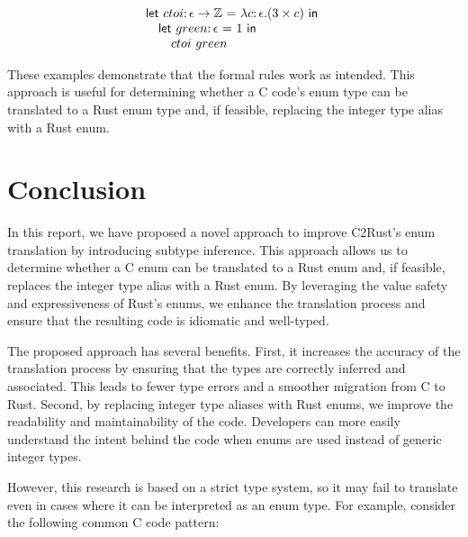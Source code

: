 \documentclass[10pt,conference]{IEEEtran}
\newcommand{\Z}{\ensuremath{\mathbb{Z}}}
\newcommand{\lett}[4]{\ensuremath{\mathsf{let}\ #1\mathsf{:}\,#2\ \mathsf{=}\ #3\ \mathsf{in}\ #4}}
\newcommand{\funct}[3]{\ensuremath{\lambda #1\mathsf{:}\,#2.#3}}
\newcommand{\apply}[2]{\ensuremath{#1\ #2}}
\begin{document}
\[
\begin{array}{l}
    \lett{ctoi}{\arrowt{\epsilon}{\Z}}{\funct{c}{\epsilon}{(3\times c)}}{}\\
    \quad \lett{green}{\epsilon}{1}{} \\
    \quad \quad \apply{ctoi}{green}
\end{array}
\]

These examples demonstrate that the formal rules work as intended. This approach is useful for determining whether a C code's enum type can be translated to a Rust enum type and, if feasible, replacing the integer type alias with a Rust enum.

\section{Conclusion}
In this report, we have proposed a novel approach to improve C2Rust's enum translation by introducing subtype inference. This approach allows us to determine whether a C enum can be translated to a Rust enum and, if feasible, replaces the integer type alias with a Rust enum. By leveraging the value safety and expressiveness of Rust's enums, we enhance the translation process and ensure that the resulting code is idiomatic and well-typed.

The proposed approach has several benefits. First, it increases the accuracy of the translation process by ensuring that the types are correctly inferred and associated. This leads to fewer type errors and a smoother migration from C to Rust. Second, by replacing integer type aliases with Rust enums, we improve the readability and maintainability of the code. Developers can more easily understand the intent behind the code when enums are used instead of generic integer types.


However, this research is based on a strict type system, so it may fail to translate even in cases where it can be interpreted as an enum type. For example, consider the following common C code pattern:
\end{document}
